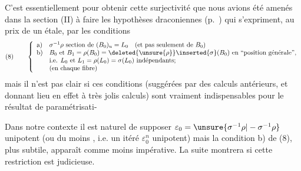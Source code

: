C'est essentiellement pour obtenir cette surjectivité que nous avions été amenés
dans la section (II) à faire les hypothèses draconiennes
(p.\ ) qui s'expriment, au prix de un étale,
par les conditions 
\[
(8)\qquad
\left\{\begin{array}{ll}
\mathrm{a)} & \sigma^{-1}\rho\text{ section de }(B_0)_u=L_0
\quad(\text{et pas seulement de }B_0)\\
\mathrm{b)} & B_0\text{ et }B_1=\rho(B_0)=
\deleted{\unsure{\rho}}\inserted{\sigma}(B_0)
\text{ en ``position générale'',}\\
&\text{i.e. }L_0\text{ et }L_1=\rho(L_0)=\sigma(L_0)
\text{ indépendants;}\\
&\text{(en chaque fibre)}
\end{array}\right.
\]
mais il n'est pas clair si ces conditions
(suggérées par des calculs antérieurs, et donnant lieu en effet à
 très jolis calculs) sont vraiment indispensables pour le résultat de paramétrisati-




Dans notre contexte il est  naturel de supposer
$\varepsilon_0=\unsure{\sigma^{-1}\rho|-\sigma^{-1}\rho}$ unipotent
(ou du moins , i.e. 
un itéré $\varepsilon_0^n$ unipotent) mais la condition b) de (8), plus subtile,
apparaît comme moins impérative. La suite montrera si cette restriction est judicieuse.

